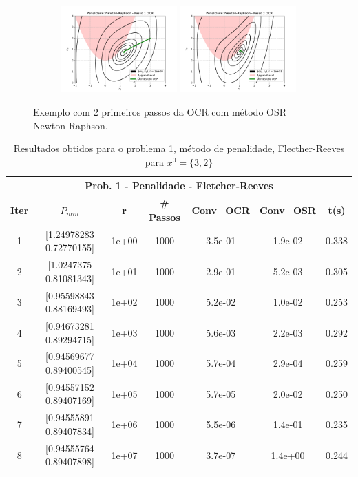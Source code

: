 \documentclass[10pt, a4paper]{article}
\begin{document}
\begin{figure}[H]
  \centering
  \begin{subfigure}[b]{\textwidth}
    \includegraphics[width=0.49\textwidth]{fig_p1/Penalidade_Newton-Raphson_1.pdf}
    \includegraphics[width=0.49\textwidth]{fig_p1/Penalidade_Newton-Raphson_2.pdf}
  \end{subfigure}
  \caption{Exemplo com 2 primeiros passos da OCR com método OSR Newton-Raphson. }
\end{figure}

\vspace{5mm}
\begin{table}[H]
  \begin{center}
    \begin{tabular}{c|c|c|c|c|c|c}
      \multicolumn{7}{c}{\textbf{Prob. 1 - Penalidade - Fletcher-Reeves}}\\
      \hline
      \textbf{Iter} & \textbf{$P_{min}$} & \textbf{r} & \textbf{\# Passos} & \textbf{Conv\_OCR} & \textbf{Conv\_OSR} & \textbf{t(s)}\\
      \hline
        1& [1.24978283 0.72770155]& 1e+00& 1000& 3.5e-01& 1.9e-02& 0.338\\
        2& [1.0247375  0.81081343]& 1e+01& 1000& 2.9e-01& 5.2e-03& 0.305\\
        3& [0.95598843 0.88169493]& 1e+02& 1000& 5.2e-02& 1.0e-02& 0.253\\
        4& [0.94673281 0.89294715]& 1e+03& 1000& 5.6e-03& 2.2e-03& 0.292\\
        5& [0.94569677 0.89400545]& 1e+04& 1000& 5.7e-04& 2.9e-04& 0.259\\
        6& [0.94557152 0.89407169]& 1e+05& 1000& 5.7e-05& 2.0e-02& 0.250\\
        7& [0.94555891 0.89407834]& 1e+06& 1000& 5.5e-06& 1.4e-01& 0.235\\
        8& [0.94555764 0.89407898]& 1e+07& 1000& 3.7e-07& 1.4e+00& 0.244\\
    \end{tabular}
  \end{center}
  \caption{Resultados obtidos para o problema 1, método de penalidade, Flecther-Reeves para $x^0=\{3,2\}$}
\end{table}
\end{document}
